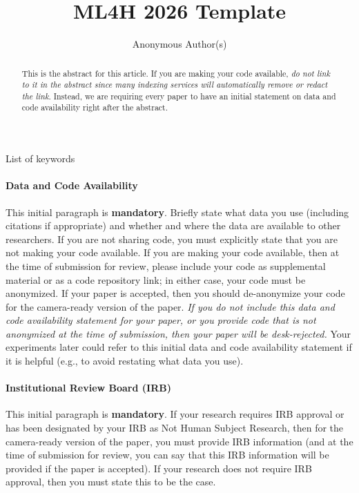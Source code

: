 \documentclass[pmlr,twocolumn,10pt]{jmlr} %
\title[Short Title]{ML4H 2026 Template}
\author{Anonymous Author(s)}
\begin{document}
\maketitle

\ifmlhdemo\else
\begin{abstract}
This is the abstract for this article. If you are making your code
available, \emph{do not link to it in the abstract since many indexing
services will automatically remove or redact the link}. Instead,
we are requiring every paper to have an initial statement on data and
code availability right after the abstract.
\end{abstract}
\begin{keywords}
List of keywords
\end{keywords}
\fi

\ifmlhneedsstatements
\paragraph*{Data and Code Availability}
This initial paragraph is \textbf{mandatory}. Briefly state what data you
use (including citations if appropriate) and whether and where the data are
available to other researchers.
If you are not sharing code, you must explicitly state that you are not
making your code available. If you are making your code available, then
at the time of submission for review, please include your code as
supplemental material or as a code repository link; in either case, your
code must be anonymized. If your paper is accepted, then you should
de-anonymize your code for the camera-ready version of the paper. \emph{If
you do not include this data and code availability statement for your
paper, or you provide code that is not anonymized at the time of
submission, then your paper will be desk-rejected.} Your experiments later
could refer to this initial data and code availability statement if it is
helpful (e.g., to avoid restating what data you use).

\paragraph*{Institutional Review Board (IRB)}
This initial paragraph is \textbf{mandatory}. If your research requires IRB
approval or has been designated by your IRB as Not Human Subject
Research, then for the camera-ready version of the paper, you must
provide IRB information (and at the time of submission for review, you
can say that this IRB information will be provided if the paper is
accepted). If your research does not require IRB approval, then you
must state this to be the case.
\fi
\end{document}
